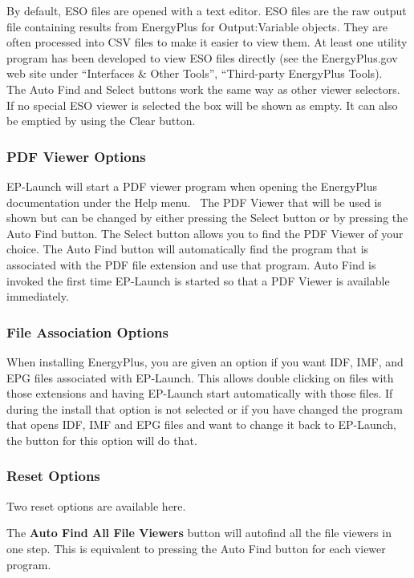 By default, ESO files are opened with a text editor. ESO files are the raw output file containing results from EnergyPlus for Output:Variable objects. They are often processed into CSV files to make it easier to view them. At least one utility program has been developed to view ESO files directly (see the EnergyPlus.gov web site under ``Interfaces \& Other Tools'', ``Third-party EnergyPlus Tools).~ The Auto Find and Select buttons work the same way as other viewer selectors. If no special ESO viewer is selected the box will be shown as empty. It can also be emptied by using the Clear button.

\subsubsection{PDF Viewer Options}\label{pdf-viewer-options}

EP-Launch will start a PDF viewer program when opening the EnergyPlus documentation under the Help menu.~ The PDF Viewer that will be used is shown but can be changed by either pressing the Select button or by pressing the Auto Find button. The Select button allows you to find the PDF Viewer of your choice. The Auto Find button will automatically find the program that is associated with the PDF file extension and use that program. Auto Find is invoked the first time EP-Launch is started so that a PDF Viewer is available immediately.

\subsubsection{File Association Options}\label{file-association-options}

When installing EnergyPlus, you are given an option if you want IDF, IMF, and EPG files associated with EP-Launch. This allows double clicking on files with those extensions and having EP-Launch start automatically with those files. If during the install that option is not selected or if you have changed the program that opens IDF, IMF and EPG files and want to change it back to EP-Launch, the button for this option will do that.

\subsubsection{Reset Options}\label{reset-options}

Two reset options are available here.

The \textbf{Auto Find All File Viewers} button will autofind all the file viewers in one step. This is equivalent to pressing the Auto Find button for each viewer program.

